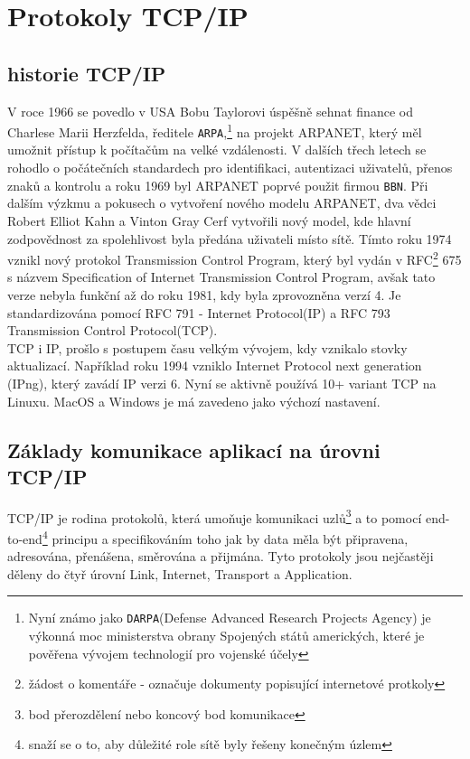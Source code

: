 \documentclass[12pt]{report}			%
\begin{document}
		\chapter{Protokoly TCP/IP}
			
			\section{historie TCP/IP}
				V roce 1966 se povedlo v USA Bobu Taylorovi úspěšně sehnat finance od Charlese Marii Herzfelda, ředitele \texttt{ARPA},\footnote{Nyní známo jako \texttt{DARPA}(Defense Advanced Research Projects Agency) je výkonná moc ministerstva obrany Spojených států amerických, které je pověřena vývojem technologií pro vojenské účely} na projekt ARPANET, který měl umožnit přístup k počítačům na velké vzdálenosti. V dalších třech letech se rohodlo o počátečních standardech pro identifikaci, autentizaci uživatelů, přenos znaků a kontrolu a roku 1969 byl ARPANET poprvé použit firmou \texttt{BBN}. 
Při dalším výzkmu a pokusech o vytvoření nového modelu ARPANET, dva vědci Robert Elliot Kahn a Vinton Gray Cerf vytvořili nový model, kde hlavní zodpovědnost za spolehlivost byla předána uživateli místo sítě. Tímto roku 1974 vznikl nový protokol Transmission Control Program, který byl vydán v RFC\footnote{žádost o komentáře - označuje dokumenty popisující internetové protkoly} 675 s názvem Specification of Internet Transmission Control Program, avšak tato verze nebyla funkční až do roku 1981, kdy byla zprovozněna verzí 4. Je standardizována pomocí RFC 791 - Internet Protocol(IP) a RFC 793 Transmission Control Protocol(TCP). 
\\
TCP i IP, prošlo s postupem času velkým vývojem, kdy vznikalo stovky aktualizací. Například roku 1994 vzniklo Internet Protocol next generation (IPng), který zavádí IP verzi 6. Nyní se aktivně používá 10+ variant TCP na Linuxu. MacOS a Windows je má zavedeno jako výchozí nastavení. \cite{History3} \cite{ARPNET} \cite{History2} \cite{History} \cite{Rules} \cite{IP} \cite{TCP}  

			\section{Základy komunikace aplikací na úrovni TCP/IP }
			TCP/IP je rodina protokolů, která umoňuje komunikaci uzlů\footnote{bod přerozdělení nebo koncový bod komunikace} a to pomocí end-to-end\footnote{snaží se o to, aby důležité role sítě byly řešeny konečným úzlem} principu a specifikováním toho jak by data měla být připravena, adresována, přenášena, směrována a přijmána. Tyto protokoly jsou nejčastěji děleny do čtyř úrovní Link, Internet, Transport a Application. \cite{zakladykomunikace1}\cite{zakladykomunikace2}\cite{zakladykomunikace3}
			
\end{document}
